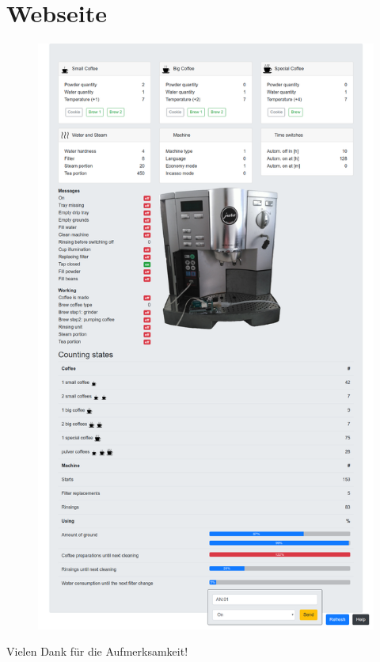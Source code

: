 \documentclass[
  de, %
  inputenc=utf8,
]{tuhhslides}
\begin{document}
\section*{Webseite}
\begin{frame}
  \begin{figure}
    \begin{center}
      \hspace*{-0.9cm}
      \includegraphics[scale=0.125]{Material/Webseite}
    \end{center}
  \end{figure}
\end{frame}



\backup

\begin{frame}
  \centering \LARGE
  Vielen Dank für die Aufmerksamkeit!
\end{frame}
\end{document}
